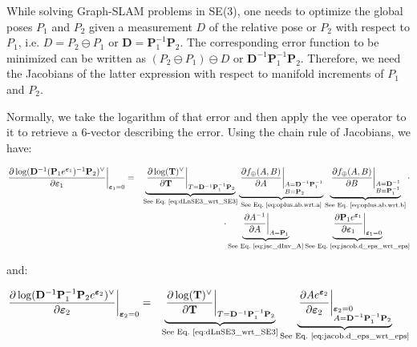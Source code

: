 \documentclass[a4paper,11pt]{report}
\newcommand{\E}{{\bm{\varepsilon}}}
\newcommand{\D}{{\mathbf{D}}}
\newcommand{\Pone}{\mathbf{P}_1}
\newcommand{\Ptwo}{\mathbf{P}_2}
\begin{document}
While solving Graph-SLAM problems in SE(3), one needs to optimize the global poses $P_1$ and $P_2$ given a measurement $D$ of the relative pose or $P_2$ with respect to $P_1$, i.e.  $D=P_2 \ominus P_1$ or $\D = \Pone^{-1} \Ptwo$.
The corresponding error function to be minimized can be written as $(P_2 \ominus P_1) \ominus D$ or $\D^{-1} \Pone^{-1} \Ptwo$.
Therefore, we need the Jacobians of the latter expression with respect to 
manifold increments of $P_1$ and $P_2$. 

Normally, we take the logarithm of that error and then apply the vee operator to it 
to retrieve a 6-vector describing the error. 
Using the chain rule of Jacobians, we have:

\begin{eqnarray}
\left. \frac{\partial \log( \D^{-1} (\Pone e^{\E_1} )^{-1} \Ptwo )^\vee}{\partial \E_1} \right|_{\E_1 = 0}
&=&
\underbrace{
\left.
 \frac{\partial \log(\mathbf{T})^\vee }{\partial \mathbf{T}}
\right|_{T=\D^{-1} \Pone^{-1} \Ptwo}
}_{\text{See Eq.~\ref{eq:dLnSE3_wrt_SE3}}}
%
\underbrace{
\left. \frac{\partial f_\oplus(A,B) }{\partial A } \right|_{\begin{subarray}{l} A=\D^{-1} \Pone^{-1} \\ B=\Ptwo \end{subarray}}
}_{\text{See Eq.~\ref{eq:oplus.ab.wrt.a}}}
\underbrace{
\left. \frac{\partial f_\oplus(A,B) }{\partial B } \right|_{\begin{subarray}{l} A=\D^{-1} \\ B=\Pone^{-1} \end{subarray}}
}_{\text{See Eq.~\ref{eq:oplus.ab.wrt.b}}}
%
\cdot  \nonumber \\ && \cdot
\underbrace{
\left. \frac{\partial A^{-1}}{\partial A} \right|_{A=\Pone}
}_{\text{See Eq.~\ref{eq:jac_dInv_A}}}
%
\underbrace{
\left. \frac{\partial \Pone e^{\E_1} }{\partial \E_1} \right|_{\E_1 = 0}
}_{\text{See Eq.~\ref{eq:jacob.d_eps_wrt_eps}}}
%
\nonumber
\\
%
\end{eqnarray}

\noindent and:

\begin{eqnarray}
\left. \frac{\partial \log( \D^{-1} \Pone ^{-1} \Ptwo e^{\E_2} )^\vee}{\partial \E_2} \right|_{\E_2 = 0}
&=&
\underbrace{
\left.
 \frac{\partial \log(\mathbf{T})^\vee }{\partial \mathbf{T}}
\right|_{T=\D^{-1} \Pone^{-1} \Ptwo}
}_{\text{See Eq.~\ref{eq:dLnSE3_wrt_SE3}}}
%
\underbrace{
\left. \frac{\partial A e^{\E_2} }{\partial \E_2} \right|_{\begin{subarray}{l} \E_2=0\\ A= \D^{-1} \Pone ^{-1} \Ptwo\end{subarray}}
}_{\text{See Eq.~\ref{eq:jacob.d_eps_wrt_eps}}}
%
\nonumber
\\
%
\end{eqnarray}
\end{document}
